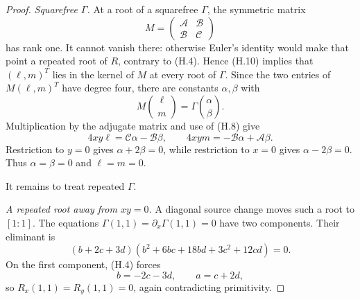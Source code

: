 \begin{proof}
\smallskip
\noindent
\emph{Squarefree \(\Gamma\).}
At a root of a squarefree \(\Gamma\), the symmetric matrix
\[
 M=\begin{pmatrix}\mathcal A&\mathcal B\\
                   \mathcal B&\mathcal C\end{pmatrix}
\]
has rank one.  It cannot vanish there: otherwise Euler's identity would
make that point a repeated root of \(R\), contrary to (H.4).  Hence
(H.10) implies that \((\ell,m)^T\) lies in the kernel of \(M\) at every
root of \(\Gamma\).  Since the two entries of
\(M(\ell,m)^T\) have degree four, there are constants \(\alpha,\beta\)
with
\[
 M\binom{\ell}{m}=\Gamma\binom{\alpha}{\beta}.
\]
Multiplication by the adjugate matrix and use of (H.8) give
\[
 4xy\ell=\mathcal C\alpha-\mathcal B\beta,
 \qquad
 4xym=-\mathcal B\alpha+\mathcal A\beta.
\]
Restriction to \(y=0\) gives \(\alpha+2\beta=0\), while restriction to
\(x=0\) gives \(\alpha-2\beta=0\).  Thus
\(\alpha=\beta=0\) and \(\ell=m=0\).

It remains to treat repeated \(\Gamma\).

\smallskip
\noindent
\emph{A repeated root away from \(xy=0\).}
A diagonal source change moves such a root to \([1:1]\).  The equations
\(\Gamma(1,1)=\partial_x\Gamma(1,1)=0\) have two components.  Their
eliminant is
\begin{equation}
 (b+2c+3d)
 (b^2+6bc+18bd+3c^2+12cd)=0.             \tag{H.11}
\end{equation}
On the first component, (H.4) forces
\[
 b=-2c-3d,
 \qquad
 a=c+2d,
\]
so \(R_x(1,1)=R_y(1,1)=0\), again contradicting primitivity.


\end{proof}
